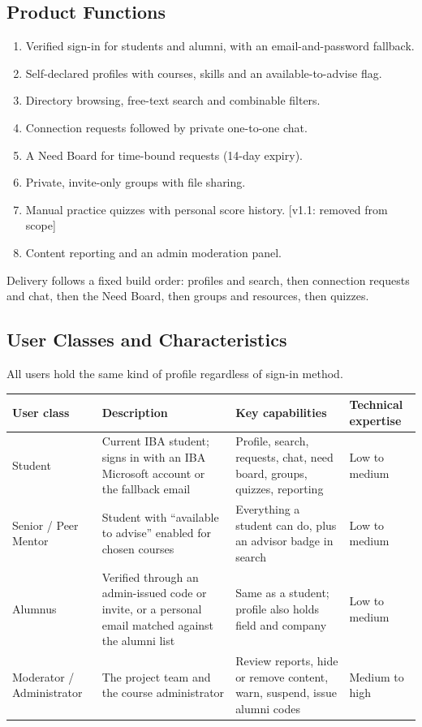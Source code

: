 \documentclass[10pt,a4paper]{article}
\newcommand{\vone}[1]{\textcolor{accent}{\small[v1.1: #1]}}
\begin{document}
\subsection{Product Functions}
\begin{enumerate}
\item Verified sign-in for students and alumni, with an email-and-password fallback.
\item Self-declared profiles with courses, skills and an available-to-advise flag.
\item Directory browsing, free-text search and combinable filters.
\item Connection requests followed by private one-to-one chat.
\item A Need Board for time-bound requests (14-day expiry).
\item Private, invite-only groups with file sharing.
\item Manual practice quizzes with personal score history. \vone{removed from scope}
\item Content reporting and an admin moderation panel.
\end{enumerate}
Delivery follows a fixed build order: profiles and search, then connection requests and chat, then the Need Board, then groups and resources, then quizzes.

\subsection{User Classes and Characteristics}
All users hold the same kind of profile regardless of sign-in method.

{\small
\begin{tabularx}{\linewidth}{@{}>{\raggedright\arraybackslash}p{22mm} >{\raggedright\arraybackslash}X >{\raggedright\arraybackslash}X >{\raggedright\arraybackslash}p{18mm}@{}}
\toprule
\textbf{User class} & \textbf{Description} & \textbf{Key capabilities} & \textbf{Technical expertise}\\\midrule
Student & Current IBA student; signs in with an IBA Microsoft account or the fallback email & Profile, search, requests, chat, need board, groups, quizzes, reporting & Low to medium\\
Senior / Peer Mentor & Student with ``available to advise'' enabled for chosen courses & Everything a student can do, plus an advisor badge in search & Low to medium\\
Alumnus & Verified through an admin-issued code or invite, or a personal email matched against the alumni list & Same as a student; profile also holds field and company & Low to medium\\
Moderator / Administrator & The project team and the course administrator & Review reports, hide or remove content, warn, suspend, issue alumni codes & Medium to high\\
\bottomrule
\end{tabularx}}
\end{document}
